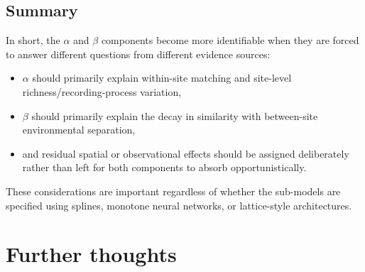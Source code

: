 \documentclass{article}
\begin{document}
\subsection{Summary}

In short, the \(\alpha\) and \(\beta\) components become more identifiable when they are forced to answer different questions from different evidence sources:
\begin{itemize}
    \item \(\alpha\) should primarily explain within-site matching and site-level richness/recording-process variation,
    \item \(\beta\) should primarily explain the decay in similarity with between-site environmental separation,
    \item and residual spatial or observational effects should be assigned deliberately rather than left for both components to absorb opportunistically.
\end{itemize}
These considerations are important regardless of whether the sub-models are specified using splines, monotone neural networks, or lattice-style architectures.

\section{Further thoughts}
\end{document}
